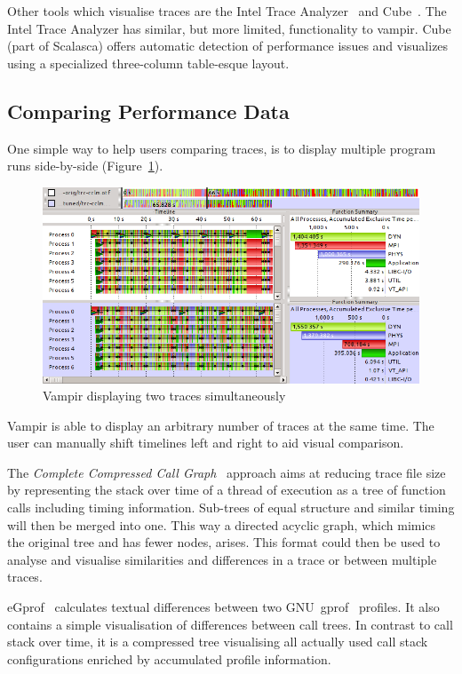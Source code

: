 \documentclass[b5paper, final, hauptseminar]{zih-template}
\begin{document}
Other tools which visualise traces are the Intel Trace Analyzer~\cite{ita} and Cube~\cite{song04}.
The Intel Trace Analyzer has similar, but more limited, functionality to vampir.
Cube (part of Scalasca) offers automatic detection of performance issues and visualizes using a specialized three-column table-esque layout.

\subsection{Comparing Performance Data}
One simple way to help users comparing traces, is to display multiple program runs side-by-side (Figure~\ref{fig:bg-comp-vampir}).
\begin{figure}[htbp]
	\centering
	\includegraphics[width=0.8\linewidth]{bg-comp-vampir}
	\caption{Vampir displaying two traces simultaneously}
	\label{fig:bg-comp-vampir}
\end{figure}
Vampir is able to display an arbitrary number of traces at the same time.
The user can manually shift timelines left and right to aid visual comparison.

The \emph{Complete Compressed Call Graph}~\cite{knuepfer08} approach aims at reducing trace file size by representing the stack over time of a thread of execution as a tree of function calls including timing information.
Sub-trees of equal structure and similar timing will then be merged into one. This way a directed acyclic graph, which mimics the original tree and has fewer nodes, arises.
This format could then be used to analyse and visualise similarities and differences in a trace or between multiple traces.

eGprof~\cite{schulz07} calculates textual differences between two GNU~gprof~\cite{graham82} profiles.
It also contains a simple visualisation of differences between call trees. In contrast to call stack over time, it is a compressed tree visualising all actually used call stack configurations enriched by accumulated profile information.
\end{document}
